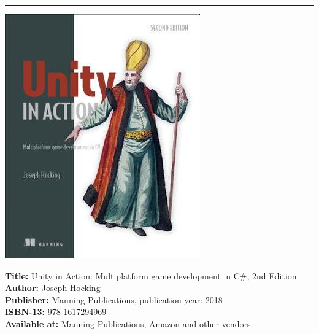 \documentclass[11pt, a4paper]{article}
\begin{document}
\hrule
\vspace{.2cm}
\begin{minipage}[b]{0.17\linewidth}          
	\includegraphics[width=.95\linewidth]{includes/images/unity-in.action.jpg}
\end{minipage}\hfill
\begin{minipage}[b]{0.75\linewidth}          
	\noindent \textbf{Title:} Unity in Action: Multiplatform game development in C\#, 2nd Edition \\
	\textbf{Author:} Joseph Hocking \\
	\textbf{Publisher:} Manning Publications, publication year: 2018  \\
	\textbf{ISBN-13:} 978-1617294969\\         
	\textbf{Available at:}     \href{https://www.manning.com/books/unity-in-action-second-edition}{Manning Publications},
	\href{https://www.amazon.ca/Unity-Action-Multiplatform-game-development/dp/1617294969}{Amazon}
	 and other vendors. 
	 \\
\end{minipage}
\vspace{.18cm}
\end{document}
